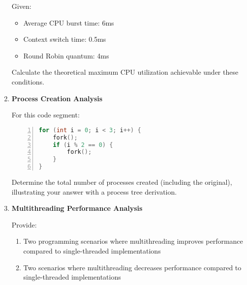 \documentclass[12pt]{article}
\begin{document}
\begin{enumerate}[leftmargin=*]
    Given:
    \begin{itemize}
        \item Average CPU burst time: 6ms
        \item Context switch time: 0.5ms
        \item Round Robin quantum: 4ms
    \end{itemize}
    
    Calculate the theoretical maximum CPU utilization achievable under these conditions.
    

    \item \textbf{Process Creation Analysis}
    
    For this code segment:
    
    \begin{lstlisting}[language=C, basicstyle=\ttfamily\footnotesize, numbers=left]
for (int i = 0; i < 3; i++) {
    fork();
    if (i % 2 == 0) {
        fork();
    }
}
    \end{lstlisting}
    
    Determine the total number of processes created (including the original), illustrating your answer with a process tree derivation.
    

    \item \textbf{Multithreading Performance Analysis}
    
    Provide:
    \begin{enumerate}[label=\arabic*.]
        \item Two programming scenarios where multithreading improves performance compared to single-threaded implementations
        \item Two scenarios where multithreading decreases performance compared to single-threaded implementations
    \end{enumerate}
    

\end{enumerate}


\end{document}
